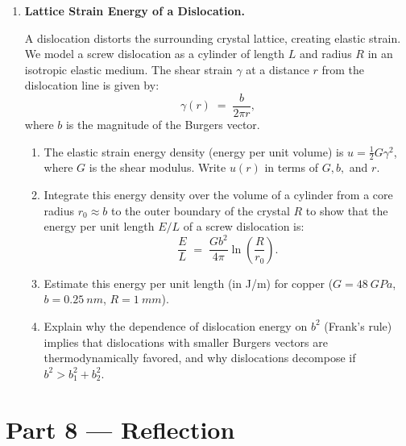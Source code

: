 \documentclass[12pt, a4paper]{book}
\begin{document}
\begin{deepbox}
\begin{enumerate}[label=\textbf{D\arabic*.}]
  \item \textbf{Lattice Strain Energy of a Dislocation.}
  
        A dislocation distorts the surrounding crystal lattice, creating elastic strain. We model a screw dislocation as a cylinder of length $L$ and radius $R$ in an isotropic elastic medium. The shear strain $\gamma$ at a distance $r$ from the dislocation line is given by:
        \[
          \gamma(r) \;=\; \frac{b}{2\pi r},
        \]
        where $b$ is the magnitude of the Burgers vector.
        \begin{enumerate}[label=(\alph*)]
          \item The elastic strain energy density (energy per unit volume) is $u = \frac{1}{2} G \gamma^2$, where $G$ is the shear modulus. Write $u(r)$ in terms of $G, b,$ and $r$.
          \item Integrate this energy density over the volume of a cylinder from a core radius $r_0 \approx b$ to the outer boundary of the crystal $R$ to show that the energy per unit length $E/L$ of a screw dislocation is:
                \[
                  \frac{E}{L} \;=\; \frac{G b^2}{4\pi} \ln\left(\frac{R}{r_0}\right).
                \]
          \item Estimate this energy per unit length (in J/m) for copper ($G = \SI{48}{GPa}$, $b = \SI{0.25}{nm}$, $R = \SI{1}{mm}$).
          \item Explain why the dependence of dislocation energy on $b^2$ (Frank's rule) implies that dislocations with smaller Burgers vectors are thermodynamically favored, and why dislocations decompose if $b^2 > b_1^2 + b_2^2$.
        \end{enumerate}
\end{enumerate}
\end{deepbox}

\newpage

\section{Part 8 --- Reflection}
\end{document}
